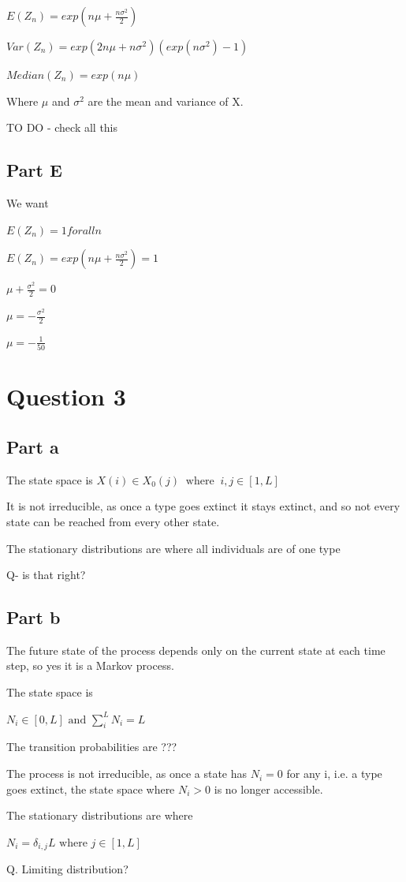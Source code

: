 \documentclass{article}
\begin{document}
\bigskip



$E(Z_n) = exp(n\mu + \frac{n\sigma^2}{2})$

$Var(Z_n) = exp(2n \mu + n\sigma^2)(exp(n\sigma^2)-1)$

$Median(Z_n) = exp(n\mu)$

Where $\mu$ and $\sigma^2$ are the mean and variance of X.


TO DO - check all this

\subsection{Part E}

We want 

$E(Z_n) = 1 for all n$

$E(Z_n) = exp(n\mu + \frac{n\sigma^2}{2}) = 1$

$\mu + \frac{\sigma^2}{2} = 0$

$\mu = - \frac{\sigma^2}{2}$

$\mu = -\frac{1}{50}$


\section{Question 3}

\subsection{Part a}

The state space is $X(i) \in X_0(j) \ \text{ where } \ i,j \in [1,L]$ 

It is not irreducible, as once a type goes extinct it stays extinct, and so not every state can be reached from every other state.

The stationary distributions are where all individuals are of one type

Q- is that right?

\subsection{Part b}

The future state of the process depends only on the current state at each time step, so yes it is a Markov process. 

The state space is 

$N_i \in [0,L] \text{ and } \sum\limits_i^LN_i = L$ 

The transition probabilities are ???

The process is not irreducible, as once a state has $N_i = 0$ for any i, i.e. a type goes extinct, the state space where $N_i >0$ is no longer accessible.

The stationary distributions are where 

$N_i = \delta_{i,j}L \text{ where } j \in [1,L]$

Q. Limiting distribution?
\end{document}

